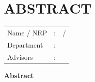 \chapter*{ABSTRACT}
\begin{center}
	\large
	\textbf{\engtatitle{}}
\end{center}

\vspace{2ex}

\begingroup
\setlength{\tabcolsep}{0pt}
\bfseries
\noindent
\begin{tabularx}{\textwidth}{l >{\centering}m{3em} X}
	Name / NRP  & : & \name{} / \nrp{} \\
	Department  & : & \engdepartment{}   \\
	Advisors 	& : & \advisor{}   \\
\end{tabularx}
\vspace{4ex}
\endgroup

\noindent
\textbf{Abstract}

